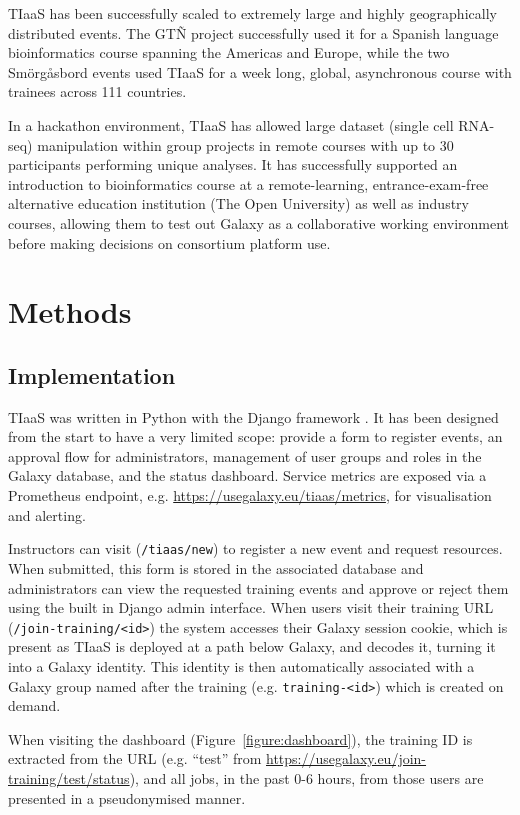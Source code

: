 \documentclass[a4paper,num-refs]{oup-contemporary}
\begin{document}
TIaaS has been successfully scaled to extremely large and highly geographically distributed events. The GT\~{N} project successfully used it for a Spanish language bioinformatics course spanning the Americas and Europe\cite{Spanscriptomics}, while the two Sm\"{o}rg\r{a}sbord events used TIaaS for a week long, global, asynchronous course with trainees across 111 countries\cite{SmorgBlog}.

In a hackathon environment, TIaaS has allowed large dataset (single cell RNA-seq) manipulation within group projects in remote courses with up to 30 participants performing unique analyses\cite{Bacon_2022}. It has successfully supported an introduction to bioinformatics course at a remote-learning, entrance-exam-free alternative education institution (The Open University) as well as industry courses, allowing them to test out Galaxy as a collaborative working environment before making decisions on consortium platform use.

\section{Methods}

\subsection{Implementation}
TIaaS was written in Python with the Django framework \cite{django}. It has been designed from the start to have a very limited scope: provide a form to register events, an approval flow for administrators, management of user groups and roles in the Galaxy database, and the status dashboard. Service metrics are exposed via a Prometheus \cite{Prometheus} endpoint, e.g. \url{https://usegalaxy.eu/tiaas/metrics}, for visualisation and alerting.

Instructors can visit (\texttt{/tiaas/new}) to register a new event and request resources. When submitted, this form is stored in the associated database and administrators can view the requested training events and approve or reject them using the built in Django admin interface. When users visit their training URL (\texttt{/join-training/<id>}) the system accesses their Galaxy session cookie, which is present as TIaaS is deployed at a path below Galaxy, and decodes it, turning it into a Galaxy identity. This identity is then automatically associated with a Galaxy group named after the training (e.g. \texttt{training-<id>}) which is created on demand.

When visiting the dashboard (Figure~\ref{figure:dashboard}), the training ID is extracted from the URL (e.g. ``test'' from \url{https://usegalaxy.eu/join-training/test/status}), and all jobs, in the past 0-6 hours, from those users are presented in a pseudonymised manner.
\end{document}

